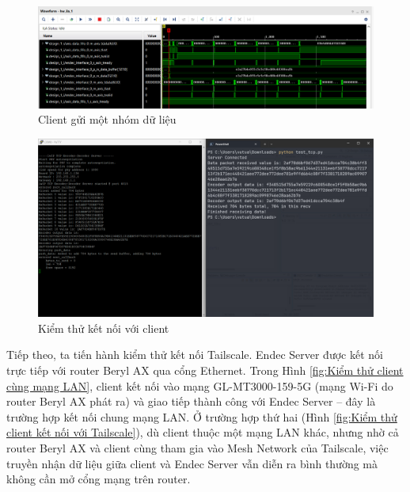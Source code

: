 \documentclass[../DoAn.tex]{subfiles}
\begin{document}
\begin{figure}[H]
    \centering
    \includegraphics[width=\textwidth, height=0.33\textheight, keepaspectratio]{Hinhve/Chuong 4/ILA transaction.png}
    \caption{Client gửi một nhóm dữ liệu}
    \label{fig:Client gửi một nhóm dữ liệu}
\end{figure}

\begin{figure}[H]
    \centering
    \includegraphics[width=\textwidth, height=0.4\textheight, keepaspectratio]{Hinhve/Chuong 4/packet test.png}
    \caption{Kiểm thử kết nối với client}
    \label{fig:Kiểm thử kết nối với client}
\end{figure}

Tiếp theo, ta tiến hành kiểm thử kết nối Tailscale. Endec Server được kết nối trực tiếp với router Beryl AX qua cổng Ethernet. Trong Hình \ref{fig:Kiểm thử client cùng mạng LAN}, client kết nối vào mạng GL-MT3000-159-5G (mạng Wi-Fi do router Beryl AX phát ra) và giao tiếp thành công với Endec Server – đây là trường hợp kết nối chung mạng LAN. Ở trường hợp thứ hai (Hình \ref{fig:Kiểm thử client kết nối với Tailscale}), dù client thuộc một mạng LAN khác, nhưng nhờ cả router Beryl AX và client cùng tham gia vào Mesh Network của Tailscale, việc truyền nhận dữ liệu giữa client và Endec Server vẫn diễn ra bình thường mà không cần mở cổng mạng trên router.
\end{document}
